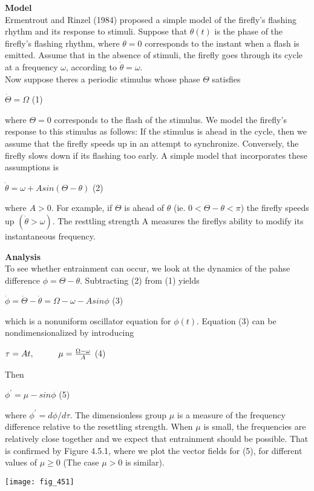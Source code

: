 \documentclass{article}
\newcommand\tab[1][1cm]{\hspace*{#1}}
\begin{document}
\textbf {Model}
\\ \tab Ermentrout and Rinzel (1984) proposed a simple model of the firefly's flashing rhythm and its response to stimuli. Suppose that $\theta(t)$ is the phase of the firefly's flashing rhythm, where $\theta=0$ corresponds to the instant when a flash is emitted. Assume that in the absence of stimuli, the firefly goes through its cycle at a frequency $\omega$, according to $\dot{\theta}=\omega$.
\\ \tab Now suppose theres a periodic stimulus whose phase $\Theta$ satisfies
\begin{center}
$\dot{\Theta}=\Omega$ \tab (1)
\end{center}
where $\Theta=0$ corresponds to the flash of the stimulus. We model the firefly's response to this stimulus as follows: If the stimulus is ahead in the cycle, then we assume that the firefly speeds up in an attempt to synchronize. Conversely, the firefly slows down if its flashing too early. A simple model that incorporates these assumptions is
\begin{center}
$\dot{\theta}=\omega+Asin(\Theta-\theta)$ \tab (2)
\end{center}
where $A>0$. For example, if $\Theta$ is ahead of $\theta$ (ie. $0<\Theta-\theta<\pi$) the firefly speeds up $(\dot{\theta}> \omega)$. The resttling strength A measures the fireflys ability to modify its instantaneous frequency.

\textbf {Analysis}
\\ \tab To see whether entrainment can occur, we look at the dynamics of the pahse difference $\phi=\Theta-\theta$. Subtracting (2) from (1) yields
\begin{center}
$\dot{\phi}=\dot{\Theta}-\dot{\theta}= \Omega-\omega-Asin\phi$ \tab (3)
\end{center}

which is a nonuniform oscillator equation for $\phi(t)$. Equation (3) can be nondimensionalized by introducing 
\begin{center}
$\tau=At, \tab \mu=\frac{\Omega-\omega}{A}$ \tab (4)
\end{center}

Then
\begin{center}
$\phi^{'}=\mu-sin\phi$ \tab (5)
\end{center}

where $\phi^{'}=d\phi/d\tau$. The dimensionless group $\mu$ is a measure of the frequency difference relative to the resettling strength. When $\mu$ is small, the frequencies are relatively close together and we expect that entrainment should be possible. That is confirmed by Figure 4.5.1, where we plot the vector fields for (5), for different values of $\mu \geq 0$ (The case $\mu >0$ is similar).

\texttt{[image: fig\_451]}
\end{document}
